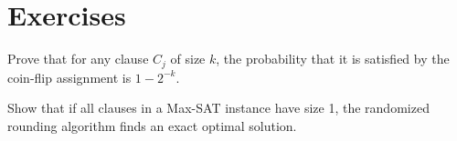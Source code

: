 \section{Exercises}
\begin{exercise}
Prove that for any clause $C_j$ of size $k$, the probability that it is satisfied by the coin-flip assignment is $1 - 2^{-k}$.
\end{exercise}
\begin{exercise}
Show that if all clauses in a Max-SAT instance have size 1, the randomized rounding algorithm finds an exact optimal solution.
\end{exercise}

